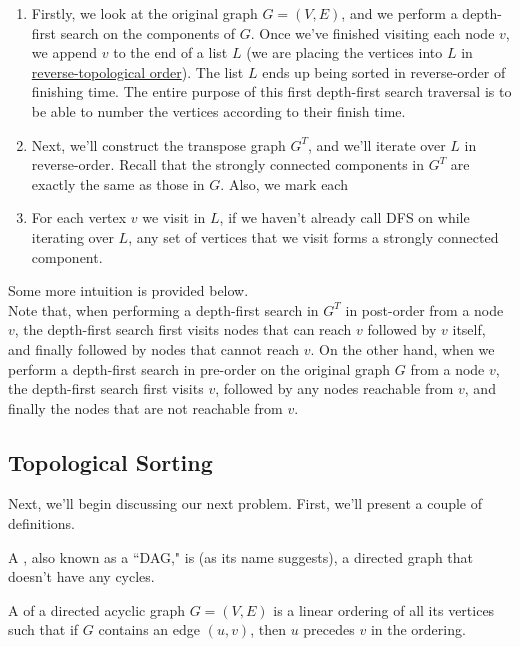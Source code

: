 \begin{enumerate}
    \item Firstly, we look at the original graph $G = (V, E)$, and we perform a depth-first search on the components of $G$. Once we've finished visiting each node $v$, we append $v$ to the end of a list $L$ (we are placing the vertices into $L$ in \hyperlink{https://en.wikipedia.org/wiki/Topological_sorting}{reverse-topological order}). The list $L$ ends up being sorted in reverse-order of finishing time. The entire purpose of this first depth-first search traversal is to be able to number the vertices according to their finish time.   
    \item Next, we'll construct the transpose graph $G^{T}$, and we'll iterate over $L$ in reverse-order. Recall that the strongly connected components in $G^{T}$ are exactly the same as those in $G$. Also, we mark each 
    \item For each vertex $v$ we visit in $L$, if we haven't already call DFS on while iterating over $L$, any set of vertices that we visit forms a strongly connected component. 
\end{enumerate}

Some more intuition is provided below. \\

Note that, when performing a depth-first search in $G^{T}$ in post-order from a node $v$, the depth-first search first visits nodes that can reach $v$ followed by $v$ itself, and finally followed by nodes that cannot reach $v$. On the other hand, when we perform a depth-first search in pre-order on the original graph $G$ from a node $v$, the depth-first search first visits $v$, followed by any nodes reachable from $v$, and finally the nodes that are not reachable from $v$. \\


\subsection{Topological Sorting}

Next, we'll begin discussing our next problem. First, we'll present a couple of definitions.

\begin{definition}
A , also known as a ``DAG," is (as its name suggests), a directed graph that doesn't have any cycles.
\end{definition}


\begin{definition}
A  of a directed acyclic graph $G = (V, E)$ is a linear ordering of all its vertices such that if $G$ contains an edge $(u, v)$, then $u$ precedes $v$ in the ordering.
\end{definition}


